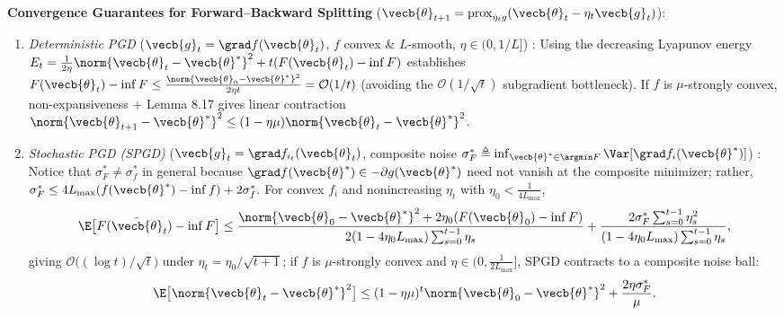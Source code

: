 \documentclass[../../../../master.tex]{subfiles}
\begin{document}
\begin{coremath}
\textbf{Convergence Guarantees for Forward--Backward Splitting} ($\vecb{\theta}_{t+1} = \operatorname{prox}_{\eta_t g}(\vecb{\theta}_t - \eta_t \vecb{g}_t)$):
\begin{enumerate}
  \item \emph{Deterministic PGD} ($\vecb{g}_t = \grad f(\vecb{\theta}_t)$, $f$ convex \& $L$-smooth, $\eta \in (0, 1/L]$) : Using the decreasing Lyapunov energy $E_t = \frac{1}{2\eta}\norm{\vecb{\theta}_t - \vecb{\theta}^*}^2 + t(F(\vecb{\theta}_t) - \inf F)$ establishes $F(\vecb{\theta}_t) - \inf F \le \frac{\norm{\vecb{\theta}_0 - \vecb{\theta}^*}^2}{2\eta t} = \mathcal{O}(1/t)$ (avoiding the $\mathcal{O}(1/\sqrt{t})$ subgradient bottleneck). If $f$ is $\mu$-strongly convex, non-expansiveness + Lemma 8.17 gives linear contraction $\norm{\vecb{\theta}_{t+1} - \vecb{\theta}^*}^2 \le (1 - \eta\mu)\norm{\vecb{\theta}_t - \vecb{\theta}^*}^2$.
  \item \emph{Stochastic PGD (SPGD)} ($\vecb{g}_t = \grad f_{i_t}(\vecb{\theta}_t)$, composite noise $\sigma_F^* \triangleq \inf_{\vecb{\theta}^*\in\argmin F}\Var[\grad f_i(\vecb{\theta}^*)]$) : Notice that $\sigma_F^* \ne \sigma_f^*$ in general because $\grad f(\vecb{\theta}^*) \in -\partial g(\vecb{\theta}^*)$ need not vanish at the composite minimizer; rather, $\sigma_F^* \le 4L_{\max}(f(\vecb{\theta}^*) - \inf f) + 2\sigma_f^*$. For convex $f_i$ and nonincreasing $\eta_t$ with $\eta_0 < \frac{1}{4L_{\max}}$,
  \begin{equation}
  \label{eq:sgd:spgd-convex}
  \E\bigl[F(\bar{\vecb{\theta}}_t) - \inf F\bigr]
  \le \frac{\norm{\vecb{\theta}_0 - \vecb{\theta}^*}^2 + 2\eta_0(F(\vecb{\theta}_0) - \inf F)}{2(1 - 4\eta_0 L_{\max})\sum_{s=0}^{t-1}\eta_s} + \frac{2\sigma_F^* \sum_{s=0}^{t-1}\eta_s^2}{(1 - 4\eta_0 L_{\max})\sum_{s=0}^{t-1}\eta_s},
  \end{equation}
  giving $\mathcal{O}\bigl((\log t)/\sqrt{t}\bigr)$ under $\eta_t = \eta_0/\sqrt{t+1}$; if $f$ is $\mu$-strongly convex and $\eta \in (0, \frac{1}{2L_{\max}}]$, SPGD contracts to a composite noise ball:
  \begin{equation}
  \label{eq:sgd:spgd-sc}
  \E\bigl[\norm{\vecb{\theta}_t - \vecb{\theta}^*}^2\bigr] \le (1 - \eta\mu)^t \norm{\vecb{\theta}_0 - \vecb{\theta}^*}^2 + \frac{2\eta \sigma_F^*}{\mu}.
  \end{equation}
\end{enumerate}
\end{coremath}
\end{document}
